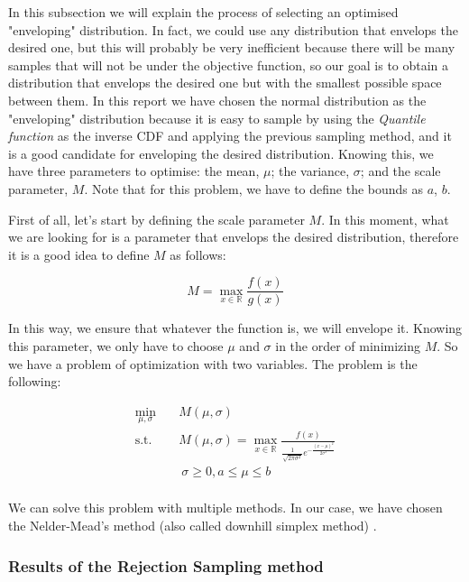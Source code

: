 \documentclass{article}
\begin{document}
In this subsection we will explain the process of selecting an optimised "enveloping" distribution. In fact, we could use any distribution that envelops the desired one, but this will probably be very inefficient because there will be many samples that will not be under the objective function, so our goal is to obtain a distribution that envelops the desired one but with the smallest possible space between them. In this report we have chosen the normal distribution as the "enveloping" distribution because it is easy to sample by using the \textit{Quantile function} as the inverse CDF and applying the previous sampling method, and it is a good candidate for enveloping the desired distribution. Knowing this, we have three parameters to optimise: the mean, \(\mu\); the variance, \(\sigma\); and the scale parameter, \(M\). Note that for this problem, we have to define the bounds as \(a\), \(b\).

First of all, let's start by defining the scale parameter \(M\). In this moment, what we are looking for is a parameter that envelops the desired distribution, therefore it is a good idea to define \(M\) as follows:

\begin{equation}
	M = \max_{x \in \mathbb{R}} \frac{f(x)}{g(x)}
\end{equation}

In this way, we ensure that whatever the function is, we will envelope it. Knowing this parameter, we only have to choose \(\mu\) and \(\sigma\) in the order of minimizing \(M\). So we have a problem of optimization with two variables. The problem is the following:

\begin{equation}
	\begin{aligned}
		\min_{\mu, \sigma} \quad & M(\mu,\sigma) \\
		\textrm{s.t.} \quad & M(\mu,\sigma) = \max_{x \in \mathbb{R}} \frac{f(x)}{\frac{1}{\sqrt{2\pi\sigma^2}}e^{-\frac{(x-\mu)^2}{2\sigma^2}}} \\
		\quad &\ \sigma \geq 0, a \leq \mu \leq b \\
	\end{aligned}
	\label{eq:problemmaxmin}
\end{equation}

We can solve this problem with multiple methods. In our case, we have chosen the Nelder-Mead's method (also called downhill simplex method) \cite{doi:10.1137/S1052623496303482}.

\subsubsection{Results of the Rejection Sampling method}
\label{sec:results_rejection_sampling}
\end{document}
